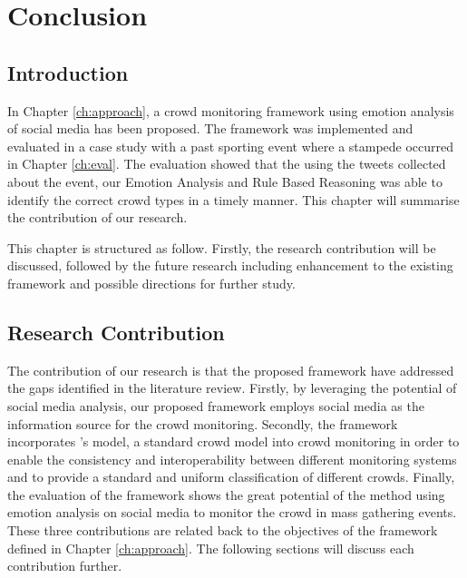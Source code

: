 \chapter{Conclusion}
\label{ch:conclusion}
\ifpdf
    \graphicspath{{Chapter6/Figs/Raster/}{Chapter6/Figs/PDF/}{Chapter6/Figs/}}
\else
    \graphicspath{{Chapter6/Figs/Vector/}{Chapter6/Figs/}}
\fi

\section{Introduction}

In Chapter \ref{ch:approach}, a crowd monitoring framework using emotion analysis of social media has been proposed. The framework was implemented and evaluated in a case study with a past sporting event where a stampede occurred in Chapter \ref{ch:eval}. The evaluation showed that the using the tweets collected about the event, our Emotion Analysis and Rule Based Reasoning was able to identify the correct crowd types in a timely manner. This chapter will summarise the contribution of our research.

This chapter is structured as follow. Firstly, the research contribution will be discussed, followed by the future research including enhancement to the existing framework and possible directions for further study.

\section{Research Contribution}
The contribution of our research is that the proposed framework have addressed the gaps identified in the literature review. Firstly, by leveraging the potential of social media analysis, our proposed framework employs social media as the information source for the crowd monitoring. Secondly, the framework incorporates \citet{Berlonghi1995}'s model, a standard crowd model into crowd monitoring in order to enable the consistency and interoperability between different monitoring systems and to provide a standard and uniform classification of different crowds. Finally, the evaluation of the framework shows the great potential of the method using emotion analysis on social media to monitor the crowd in mass gathering events. These three contributions are related back to the objectives of the framework defined in Chapter \ref{ch:approach}. The following sections will discuss each contribution further.

